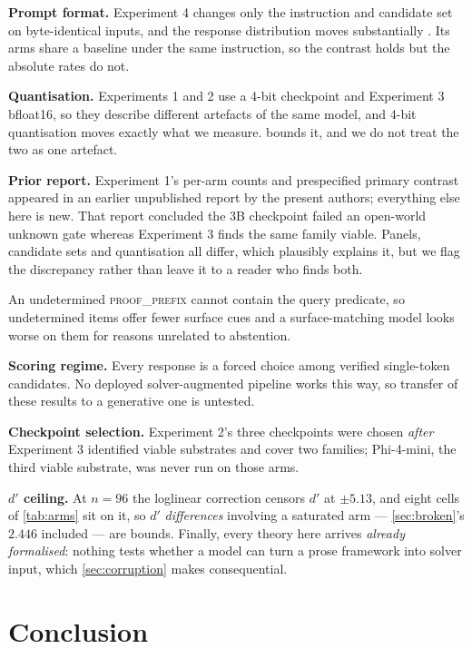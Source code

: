 \documentclass[10pt,twocolumn]{article}
\begin{document}
\textbf{Prompt format.} Experiment 4 changes only the instruction and candidate
set on byte-identical inputs, and the response distribution moves substantially
\citep{zhao2021calibrate,zheng2023large}. Its arms share a baseline under the
same instruction, so the contrast holds but the absolute rates do not.



\textbf{Quantisation.} Experiments 1 and 2 use a 4-bit checkpoint and Experiment
3 bfloat16, so they describe different artefacts of the same model, and 4-bit quantisation
moves exactly what we measure.  bounds it, and we do not treat the two as one artefact.

\textbf{Prior report.} Experiment 1's per-arm counts and prespecified primary
contrast appeared in an earlier unpublished report by the present authors;
everything else here is new. That report concluded the 3B checkpoint failed an
open-world unknown gate whereas Experiment 3 finds the same family viable. Panels,
candidate sets and quantisation all differ, which plausibly explains it, but we
flag the discrepancy rather than leave it to a reader who finds both.

An undetermined \textsc{proof\_prefix} cannot contain the query predicate, so
undetermined items offer fewer surface cues and a surface-matching model looks
worse on them for reasons unrelated to abstention.

\textbf{Scoring regime.} Every response is a forced choice among verified
single-token candidates. No deployed solver-augmented pipeline works this way, so
transfer of these results to a generative one is untested.

\textbf{Checkpoint selection.} Experiment 2's three checkpoints were chosen
\emph{after} Experiment 3 identified viable substrates and cover two families;
Phi-4-mini, the third viable substrate, was never run on those arms.

\textbf{$d'$ ceiling.} At $n = 96$ the loglinear correction censors $d'$ at
$\pm 5.13$, and eight cells of \cref{tab:arms} sit on it, so $d'$
\emph{differences} involving a saturated arm --- \cref{sec:broken}'s $2.446$
included --- are bounds. Finally, every theory here arrives \emph{already
formalised}: nothing tests whether a model can turn a prose framework into solver
input, which \cref{sec:corruption} makes consequential.

\section{Conclusion}
\end{document}
